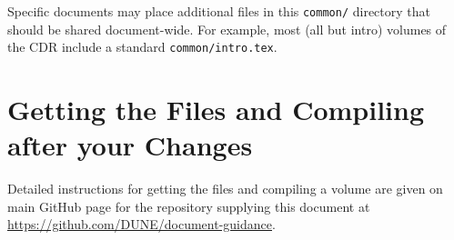 Specific documents may place additional files in this \texttt{common/}
directory that should be shared document-wide.
For example, most (all but intro) volumes of the CDR include a standard \texttt{common/intro.tex}.

\section{Getting the Files and Compiling after your Changes}
\label{sec:getfiles-compile}

Detailed instructions for getting the files and compiling a volume are
given on main GitHub page for the repository supplying this document at
\url{https://github.com/DUNE/document-guidance}.
  
